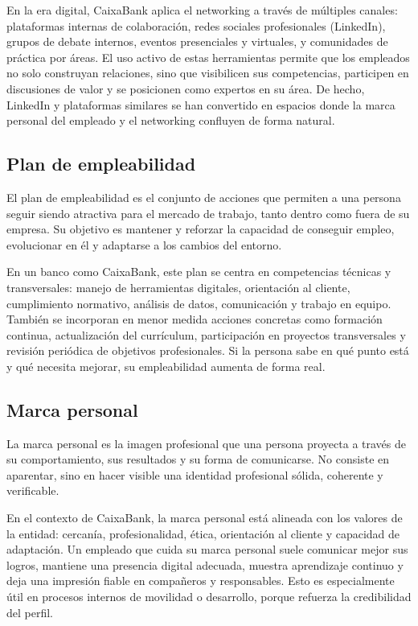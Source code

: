En la era digital, CaixaBank aplica el networking a través de múltiples canales: plataformas internas de colaboración, redes sociales profesionales (LinkedIn), grupos de debate internos, eventos presenciales y virtuales, y comunidades de práctica por áreas. El uso activo de estas herramientas permite que los empleados no solo construyan relaciones, sino que visibilicen sus competencias, participen en discusiones de valor y se posicionen como expertos en su área. De hecho, LinkedIn y plataformas similares se han convertido en espacios donde la marca personal del empleado y el networking confluyen de forma natural.

\subsection{Plan de empleabilidad}
El plan de empleabilidad es el conjunto de acciones que permiten a una persona seguir siendo atractiva para el mercado de trabajo, tanto dentro como fuera de su empresa. Su objetivo es mantener y reforzar la capacidad de conseguir empleo, evolucionar en él y adaptarse a los cambios del entorno.

En un banco como CaixaBank, este plan se centra en competencias técnicas y transversales: manejo de herramientas digitales, orientación al cliente, cumplimiento normativo, análisis de datos, comunicación y trabajo en equipo. También se incorporan en menor medida acciones concretas como formación continua, actualización del currículum, participación en proyectos transversales y revisión periódica de objetivos profesionales. Si la persona sabe en qué punto está y qué necesita mejorar, su empleabilidad aumenta de forma real.

\subsection{Marca personal}
La marca personal es la imagen profesional que una persona proyecta a través de su comportamiento, sus resultados y su forma de comunicarse. No consiste en aparentar, sino en hacer visible una identidad profesional sólida, coherente y verificable.

En el contexto de CaixaBank, la marca personal está alineada con los valores de la entidad: cercanía, profesionalidad, ética, orientación al cliente y capacidad de adaptación. Un empleado que cuida su marca personal suele comunicar mejor sus logros, mantiene una presencia digital adecuada, muestra aprendizaje continuo y deja una impresión fiable en compañeros y responsables. Esto es especialmente útil en procesos internos de movilidad o desarrollo, porque refuerza la credibilidad del perfil.

